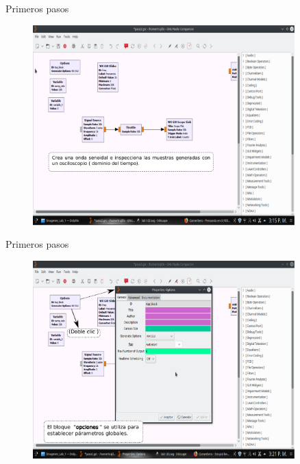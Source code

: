 \begin{frame}{Primeros pasos }
\begin{figure}[H]
\centering
\vspace{-3mm}
\includegraphics[width=0.9\textwidth]{parte1/lab1/pdf/lab1_2.pdf}
\end{figure}
\end{frame}

\begin{frame}{Primeros pasos }
\begin{figure}[H]
\vspace{-3mm}
\centering
\includegraphics[width=0.9\textwidth]{parte1/lab1/pdf/lab1_3.pdf}
\end{figure}
\end{frame}

